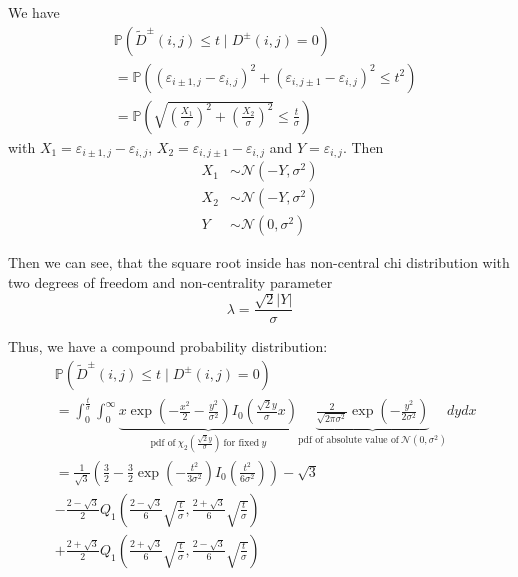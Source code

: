 \documentclass{beamer}
\newcommand{\abs}[1]{\lvert#1\rvert}
\begin{document}
\begin{frame}
	We have
	\begin{align*}
		&\mathbb{P}(\tilde{D}^\pm(i, j) \leq t \mid D^\pm(i, j) = 0) \\
		&= \mathbb{P}\left( (\varepsilon_{i \pm 1, j} - \varepsilon_{i, j})^2 + (\varepsilon_{i, j \pm 1} - \varepsilon_{i, j})^2 \leq t^2 \right) \\
		&= \mathbb{P}\left( \sqrt{\left( \frac{X_1}{\sigma} \right)^2 + \left( \frac{X_2}{\sigma} \right)^2} \leq \frac{t}{\sigma} \right)
	\end{align*}
	with $X_1 = \varepsilon_{i \pm 1, j} - \varepsilon_{i, j}$, $X_2 = \varepsilon_{i, j \pm 1} - \varepsilon_{i, j}$ and $Y = \varepsilon_{i, j}$. Then
	\begin{align*}
		X_1 &\sim \mathcal{N}(- Y, \sigma^2) \\
		X_2 &\sim \mathcal{N}(- Y, \sigma^2) \\
		Y &\sim \mathcal{N}(0, \sigma^2)
	\end{align*}
	
	Then we can see, that the square root inside has non-central chi distribution with two degrees of freedom and non-centrality parameter
	\begin{equation*}
		\lambda = \frac{\sqrt{2} \abs{Y}}{\sigma}
	\end{equation*}
\end{frame}

\begin{frame}
	Thus, we have a compound probability distribution:
	\begin{align*}
		&\mathbb{P}(\tilde{D}^\pm(i, j) \leq t \mid D^\pm(i, j) = 0) \\
		&= \int_0^\frac{t}{\sigma} \int_0^\infty \underbrace{x \exp \left( - \frac{x^2}{2} - \frac{y^2}{\sigma^2} \right) I_0 \left( \frac{\sqrt{2} y}{\sigma} x \right)}_{\textrm{pdf of} \ \chi_2 \left( \frac{\sqrt{2} y}{\sigma} \right) \ \textrm{for fixed} \ y} \underbrace{\frac{2}{\sqrt{2 \pi \sigma^2}} \exp \left( - \frac{y^2}{2 \sigma^2} \right)}_{\textrm{pdf of absolute value of} \ \mathcal{N}(0, \sigma^2)} dy dx \\
		&= \frac{1}{\sqrt{3}} \left( \frac{3}{2} - \frac{3}{2} \exp \left( - \frac{t^2}{3 \sigma^2} \right) I_0 \left( \frac{t^2}{6 \sigma^2} \right) \right) - \sqrt{3} \\
		&- \frac{2 - \sqrt{3}}{2} Q_1 \left( \frac{2 - \sqrt{3}}{6} \sqrt{\frac{t}{\sigma}}, \frac{2 + \sqrt{3}}{6} \sqrt{\frac{t}{\sigma}} \right) \\
		&+ \frac{2 + \sqrt{3}}{2} Q_1 \left( \frac{2 + \sqrt{3}}{6} \sqrt{\frac{t}{\sigma}}, \frac{2 - \sqrt{3}}{6} \sqrt{\frac{t}{\sigma}} \right)
	\end{align*}
\end{frame}
\end{document}

